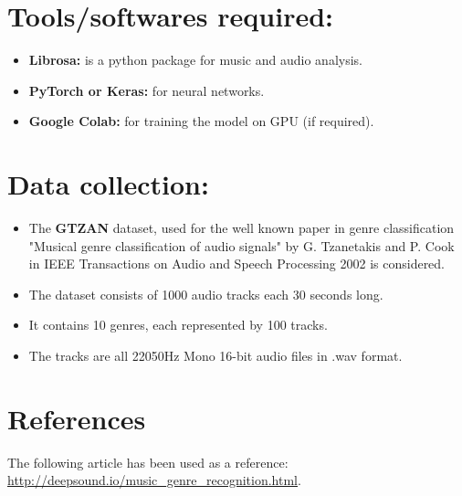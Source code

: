 \documentclass[]{report}
\begin{document}
\section{Tools/softwares required:}
\begin{itemize}
	\item \textbf{Librosa:} is a python package for music and audio analysis.
	\item \textbf{PyTorch or Keras:} for neural networks. 
	\item \textbf{Google Colab:} for training the model on GPU (if required).
	
\end{itemize}
\section{Data collection:}
\begin{itemize}
	\item The \textbf{GTZAN} dataset, used for the well known paper in genre classification "Musical
	genre classification of audio signals" by G. Tzanetakis and P. Cook in IEEE
	Transactions on Audio and Speech Processing 2002 is considered.
	\item The dataset consists of 1000 audio tracks each 30 seconds long. 
	\item It contains 10 genres, each represented by 100 tracks.
	\item The tracks are all 22050Hz Mono 16-bit audio files in .wav format.
\end{itemize}

\section{References}
The following article has been used as a reference: \url{http://deepsound.io/music_genre_recognition.html}.
\end{document}

